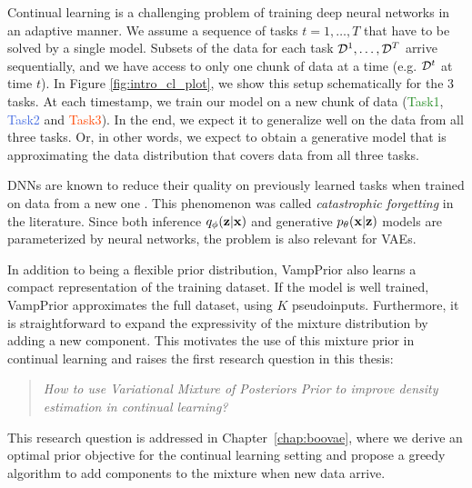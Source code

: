 Continual learning is a challenging problem of training deep neural networks in an adaptive manner. We assume a sequence of tasks $t=1,\dots,T$ that have to be solved by a single model.
Subsets of the data for each task $\mathcal{D}^1, \dots ,\mathcal{D}^T$ arrive sequentially, and we have access to only one chunk of data at a time (e.g. $\mathcal{D}^t$ at time $t$). In Figure \ref{fig:intro_cl_plot}, we show this setup schematically for the 3 tasks. At each timestamp, we train our model on a new chunk of data (\textcolor{ForestGreen}{Task1}, \textcolor{RoyalBlue}{Task2} and \textcolor{OrangeRed}{Task3}). In the end, we expect it to generalize well on the data from all three tasks. Or, in other words, we expect to obtain a generative model that is approximating the data distribution that covers data from all three tasks.   

DNNs are known to reduce their quality on previously learned tasks when trained on data from a new one \citep{kirkpatrick2017overcoming}. This phenomenon was called \textit{catastrophic forgetting} \citep{mccloskey1989catastrophic} in the literature. Since both inference ${q_{\phi}({\mathbf{z}}|{\mathbf{x}})}$ and generative ${p_{\theta}({\mathbf{x}}|{\mathbf{z}})}$ models are parameterized by neural networks, the problem is also relevant for VAEs.  

In addition to being a flexible prior distribution, VampPrior also learns a compact representation of the training dataset. If the model is well trained, VampPrior approximates the full dataset, using $K$ pseudoinputs. 
Furthermore, it is straightforward to expand the expressivity of the mixture distribution by adding a new component.
This motivates the use of this mixture prior in continual learning and raises the first research question in this thesis:

\begin{quote}
	\textit{How to use Variational Mixture of Posteriors Prior to improve density estimation in continual learning?}
\end{quote}
This research question is addressed in Chapter~\ref{chap:boovae}, where we derive an optimal prior objective for the continual learning setting and propose a greedy algorithm to add components to the mixture when new data arrive. 


